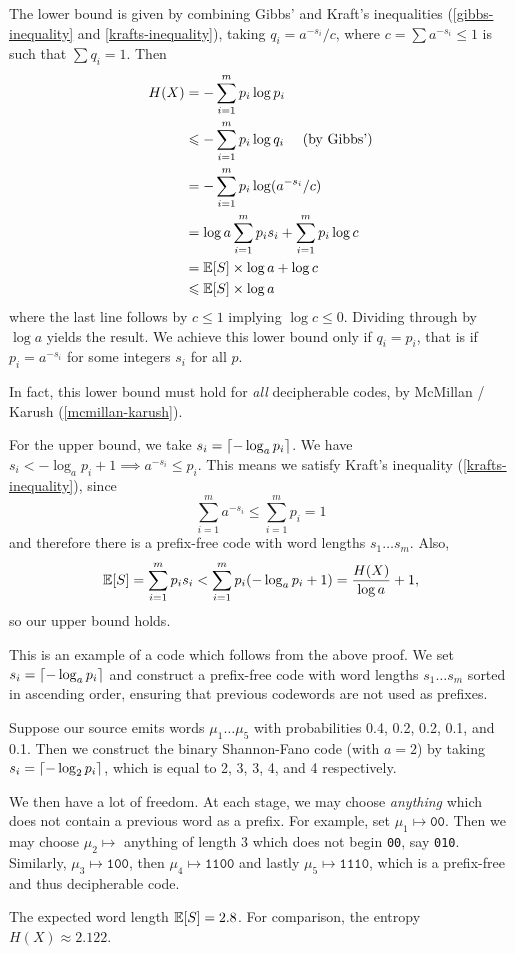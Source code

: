 \documentclass{article}
\begin{document}
\begin{prf}
    The lower bound is given by combining Gibbs' and Kraft's inequalities
    (\ref{gibbs-inequality} and \ref{krafts-inequality}),
    taking $q_i = a^{-s_i}/c$,
    where $c = \sum a^{-s_i} \leq 1$
    is such that $\sum q_i = 1$. Then
    \begin{align*}
    	H(X) &= - \sum_{i=1}^m p_i \log p_i \\
    	&\leqslant - \sum_{i=1}^m p_i \log q_i \quad \text{ (by Gibbs')} \\
    	&= - \sum_{i=1}^m p_i \log (a^{-s_i}/c) \\
    	&= \log a \sum_{i=1}^m p_i s_i + \sum_{i=1}^m p_i \log c \\
    	&= \mathbb{E}[S] \times \log a + \log c \\
    	&\leqslant  \mathbb{E}[S] \times \log a
	\end{align*}
	where the last line follows by
	$c \leq 1$ implying $\log c \leq 0$.
	Dividing through by $\log a$ yields the result.
	We achieve this lower bound only if $q_i = p_i$,
	that is if $p_i = a^{-s_i}$ for some integers $s_i$ for all $p$.
	
	In fact, this lower bound must hold for \textit{all} decipherable codes,
	by McMillan / Karush (\ref{mcmillan-karush}).
	
	For the upper bound, we take
	$s_i = \left\lceil-\log_a p_i\right\rceil$.
	We have $s_i < - \log_a p_i + 1 \implies a^{-s_i} \leq p_i$.
	This means we satisfy Kraft's inequality (\ref{krafts-inequality}), since
	\[
	\sum_{i=1}^m a^{-s_i} \leq
	\sum_{i=1}^m p_i = 1
	\]
	and therefore there is a prefix-free code
	with word lengths $s_1 \dots s_m$. Also,
	\[
	\mathbb{E}[S] =
	\sum_{i=1}^m p_i s_i <
	\sum_{i=1}^m p_i (-\log_a p_i + 1) =
	\frac{H(X)}{\log a} + 1,
	\]
	so our upper bound holds.
\end{prf}

\begin{example}
    This is an example of a code which follows from the above proof.
    We set $s_i = \left\lceil- \log_a p_i\right\rceil$
    and construct a prefix-free code with word lengths $s_1 \dots s_m$
    sorted in ascending order,
    ensuring that previous codewords are not used as prefixes.
    
    Suppose our source emits words $\mu_1 \dots \mu_5$
    with probabilities 0.4, 0.2, 0.2, 0.1, and 0.1.
    Then we construct the binary Shannon-Fano code (with $a=2$)
    by taking $s_i = \left\lceil-\log_2 p_i\right\rceil$,
    which is equal to 2, 3, 3, 4, and 4 respectively.
    
    We then have a lot of freedom.
    At each stage, we may choose \textit{anything}
    which does not contain a previous word as a prefix.
    For example, set $\mu_1 \mapsto \texttt{00}$.
    Then we may choose $\mu_2 \mapsto$ anything of length 3
    which does not begin \texttt{00}, say \texttt{010}.
    Similarly, $\mu_3 \mapsto \texttt{100}$,
    then $\mu_4 \mapsto \texttt{1100}$
    and lastly $\mu_5 \mapsto \texttt{1110}$,
    which is a prefix-free and thus decipherable code.
    
    The expected word length $\mathbb{E}[S] = 2.8$.
    For comparison, the entropy $H(X) \approx 2.122$.
\end{example}
\end{document}
